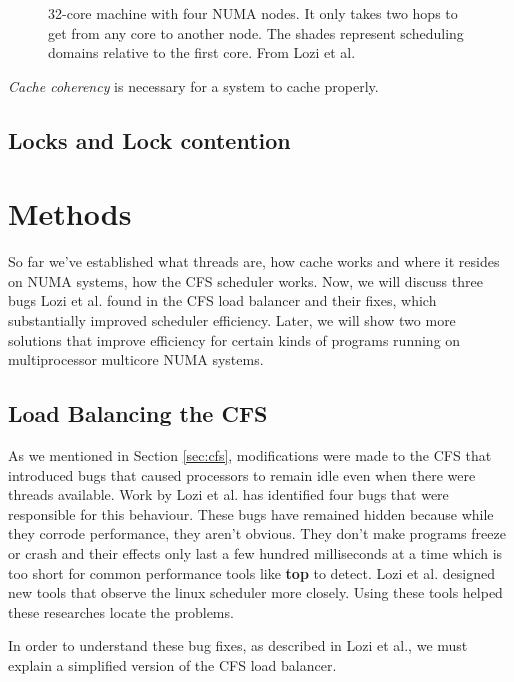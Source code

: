 \documentclass{sig-alternate}
\begin{document}
\begin{figure}
\centering
{}
\caption{32-core machine with four NUMA nodes. It only takes two hops to get from any core to another node. The shades represent scheduling domains relative to the first core.  From Lozi et al.~\cite{Lozi:2016}}
\label{fig:NUMA}
\end{figure}

\emph{Cache coherency} is necessary for a system to cache properly. ~\cite{Systems}

\subsection{Locks and Lock contention}
\label{sec:locks}


\section{Methods}
\label{sec:methods}

So far we've established what threads are, how cache works and where it resides on NUMA systems, how the CFS scheduler works. Now, we will discuss three bugs Lozi et al. found in the CFS load balancer and their fixes, which substantially improved scheduler efficiency. Later, we will show two more solutions that improve efficiency for certain kinds of programs running on multiprocessor multicore NUMA systems.

\subsection{Load Balancing the CFS}
\label{sec:loadbalance}

As we mentioned in Section \ref{sec:cfs}, modifications were made to the CFS that introduced bugs that caused processors to remain idle even when there were threads available. Work by Lozi et al. has identified four bugs that were responsible for this behaviour. These bugs have remained hidden because while they corrode performance, they aren't obvious. They don't make programs freeze or crash and their effects only last a few hundred milliseconds at a time which is too short for common performance tools like \textbf{top} to detect. Lozi et al. designed new tools that observe the linux scheduler more closely. Using these tools helped these researches locate the problems.~\cite{Lozi:2016}

In order to understand these bug fixes, as described in Lozi et al., we must explain a simplified version of the CFS load balancer.~\cite{Lozi:2016}
\end{document}
